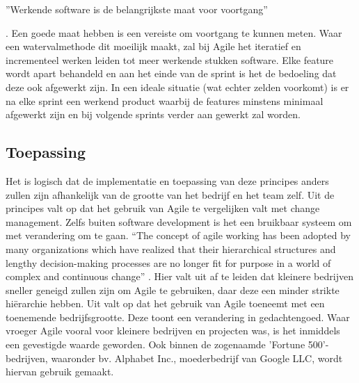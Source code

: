 ''Werkende software is de belangrijkste maat voor voortgang''

\autocite{Beck2001}. Een goede maat hebben is een vereiste om voortgang te kunnen meten. Waar een watervalmethode dit moeilijk maakt, zal bij Agile het iteratief en incrementeel werken leiden tot meer werkende stukken software. Elke feature wordt apart behandeld en aan het einde van de sprint is het de bedoeling dat deze ook afgewerkt zijn. In een ideale situatie (wat echter zelden voorkomt) is er na elke sprint een werkend product waarbij de features minstens minimaal afgewerkt zijn en bij volgende sprints verder aan gewerkt zal worden.

\subsection{Toepassing}
Het is logisch dat de implementatie en toepassing van deze principes anders zullen zijn afhankelijk van de grootte van het bedrijf en het team zelf. Uit de principes valt op dat het gebruik van Agile te vergelijken valt met change management. Zelfs buiten software development is het een bruikbaar systeem om met verandering om te gaan. 
``The concept of agile working has been adopted by many organizations which have realized that their hierarchical structures and lengthy decision-making processes are no longer fit for purpose in a world of complex and continuous change'' \autocite{Franklin2014}. Hier valt uit af te leiden dat kleinere bedrijven sneller geneigd zullen zijn om Agile te gebruiken, daar deze een minder strikte hiërarchie hebben. Uit \textcite{Salo2008} valt op dat het gebruik van Agile toeneemt met een toenemende bedrijfsgrootte. Deze toont een verandering in gedachtengoed. Waar vroeger Agile vooral voor kleinere bedrijven en projecten was, is het inmiddels een gevestigde waarde geworden. Ook binnen de zogenaamde 'Fortune 500'-bedrijven, waaronder bv. Alphabet Inc., moederbedrijf van Google LLC, wordt hiervan gebruik gemaakt. 

